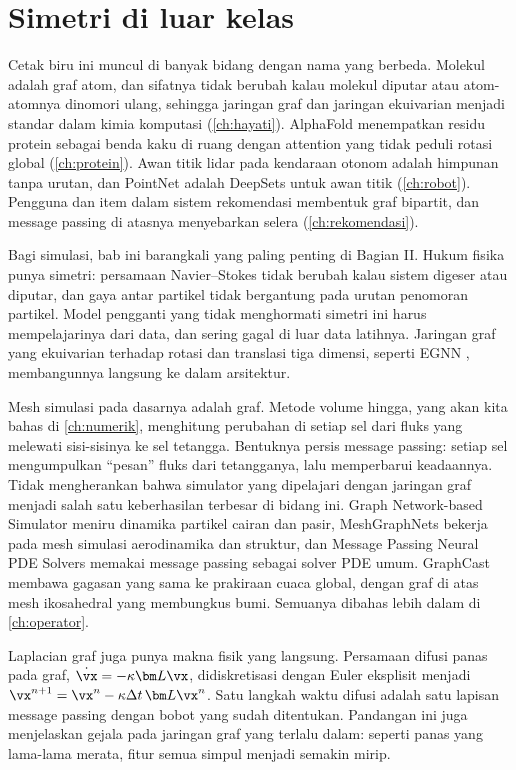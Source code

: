 \section{Simetri di luar kelas}

Cetak biru ini muncul di banyak bidang dengan nama yang berbeda. Molekul adalah graf atom, dan sifatnya
tidak berubah kalau molekul diputar atau atom-atomnya dinomori ulang, sehingga jaringan graf dan jaringan
ekuivarian menjadi standar dalam kimia komputasi (\cref{ch:hayati}). AlphaFold menempatkan residu protein
sebagai benda kaku di ruang dengan attention yang tidak peduli rotasi global (\cref{ch:protein}). Awan titik
lidar pada kendaraan otonom adalah himpunan tanpa urutan, dan PointNet adalah DeepSets untuk awan titik
(\cref{ch:robot}). Pengguna dan item dalam sistem rekomendasi membentuk graf bipartit, dan message passing
di atasnya menyebarkan selera (\cref{ch:rekomendasi}).

Bagi simulasi, bab ini barangkali yang paling penting di Bagian II. Hukum fisika punya simetri:
persamaan Navier--Stokes tidak berubah kalau sistem digeser atau diputar, dan gaya antar partikel
tidak bergantung pada urutan penomoran partikel. Model pengganti yang tidak menghormati simetri
ini harus mempelajarinya dari data, dan sering gagal di luar data latihnya. Jaringan graf yang
ekuivarian terhadap rotasi dan translasi tiga dimensi, seperti EGNN \citep{satorras2021},
membangunnya langsung ke dalam arsitektur.

Mesh simulasi pada dasarnya adalah graf. Metode volume hingga, yang akan kita bahas di
\cref{ch:numerik}, menghitung perubahan di setiap sel dari fluks yang melewati sisi-sisinya ke sel
tetangga. Bentuknya persis message passing: setiap sel mengumpulkan ``pesan'' fluks dari
tetangganya, lalu memperbarui keadaannya. Tidak mengherankan bahwa simulator yang dipelajari
dengan jaringan graf menjadi salah satu keberhasilan terbesar di bidang ini. Graph Network-based
Simulator \citep{sanchez2020} meniru dinamika partikel cairan dan pasir, MeshGraphNets
\citep{pfaff2021} bekerja pada mesh simulasi aerodinamika dan struktur, dan Message Passing Neural
PDE Solvers \citep{brandstetter2022} memakai message passing sebagai solver PDE umum. GraphCast
\citep{lam2023} membawa gagasan yang sama ke prakiraan cuaca global, dengan graf di atas mesh
ikosahedral yang membungkus bumi. Semuanya dibahas lebih dalam di \cref{ch:operator}.

Laplacian graf juga punya makna fisik yang langsung. Persamaan difusi panas pada graf,
$\dot{\vx}=-\kappa\bm L\vx$, didiskretisasi dengan Euler eksplisit menjadi
$\vx^{n+1}=\vx^n-\kappa\Delta t\,\bm L\vx^n$. Satu langkah waktu difusi adalah satu lapisan message
passing dengan bobot yang sudah ditentukan. Pandangan ini juga menjelaskan gejala
 pada jaringan graf yang terlalu dalam: seperti panas yang lama-lama merata,
fitur semua simpul menjadi semakin mirip.


